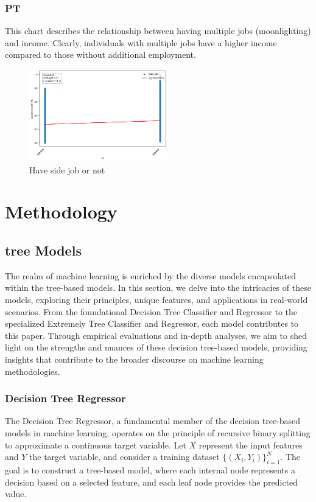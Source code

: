 \documentclass[twocolumn]{article}
\begin{document}
		\subsubsection{PT}
This chart describes the relationship between having multiple jobs (moonlighting) and income. Clearly, individuals with multiple jobs have a higher income compared to those without additional employment.
		\begin{figure}[H]
		\centering
		\includegraphics[width=6cm]{PT.png} 
		\caption{Have side job or not} 
		\label{Fig.PT} 
		\end{figure}
		
\section{Methodology}
	\subsection{tree Models}
The realm of machine learning is enriched by the diverse models encapsulated within the tree-based models. In this section, we delve into the intricacies of these models, exploring their principles, unique features, and applications in real-world scenarios. From the foundational Decision Tree Classifier and Regressor to the specialized Extremely Tree Classifier and Regressor, each model contributes to this paper. Through empirical evaluations and in-depth analyses, we aim to shed light on the strengths and nuances of these decision tree-based models, providing insights that contribute to the broader discourse on machine learning methodologies.
		\subsubsection{Decision Tree Regressor}
The Decision Tree Regressor, a fundamental member of the decision tree-based models in machine learning, operates on the principle of recursive binary splitting to approximate a continuous target variable. Let \(X\) represent the input features and \(Y\) the target variable, and consider a training dataset \(\{(X_i, Y_i)\}_{i=1}^{N}\). The goal is to construct a tree-based model, where each internal node represents a decision based on a selected feature, and each leaf node provides the predicted value.
\end{document}
